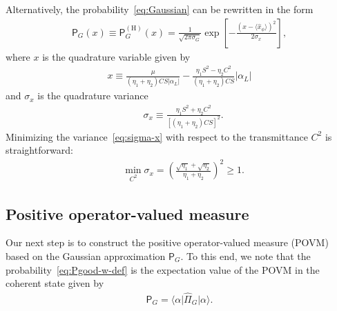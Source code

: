 \documentclass[%
reprint,
superscriptaddress,
 amsmath,amssymb,amsfonts,
 aps,
 pra,
 longbibliography
]{revtex4-2}
\newcommand{\ket}[1]{\ensuremath{|{#1}\rangle}}
\newcommand{\bra}[1]{\ensuremath{\langle{#1}|}}
\newcommand{\avr}[1]{\ensuremath{\langle{#1}\rangle}}
\newcommand{\ind}[1]{\mathrm{#1}}
\newcommand{\prob}{\mathsf{P}}
\DeclareMathOperator*{\argmin}{arg\,min}
\begin{document}
Alternatively, the probability~\eqref{eq:Gaussian}
can be rewritten in the form
\begin{align}
  \label{eq:Pgood-w-def}
{\prob}_G(x)\equiv {\prob}_G^{(\ind{H})}(x)=\frac{1}{\sqrt{2\pi\sigma_G}}
    \exp \left[-\frac{(x-\avr{\hat{x}_\phi})^2}{2\sigma_x}\right],
\end{align}
where
$x$ is the quadrature variable given by
\begin{align}
  \label{eq:x-def}
  x\equiv\frac{\mu}{(\eta_1+\eta_2)CS\left|\alpha_L\right|}-\frac{\eta_1S^2-\eta_2C^2}{\left(\eta_1+\eta_2\right)CS}\left|\alpha_L\right|
\end{align}
and $\sigma_x$ is the quadrature variance
\begin{align}
  &
        \label{eq:sigma-x}
    \sigma_x\equiv
    \frac{\eta_1S^2+\eta_2C^2}{
    \left[(\eta_1+\eta_2)CS\right]^2
    }.
\end{align}
Minimizing the variance~\eqref{eq:sigma-x} with respect to the transmittance $C^2$  is straightforward:
\begin{align}
  \label{eq:sigma-x-min}
  &\min_{C^2}\sigma_{x}=\left(
\frac{\sqrt{\eta_1}+\sqrt{\eta_2}}{\eta_1+\eta_2}
  \right)^2\ge 1.%
\end{align}

\subsection{Positive operator-valued measure}
\label{subsec:hom-POVM}

Our next step is to construct
the positive operator-valued measure
(POVM) based on the Gaussian approximation $\prob_G$.
To this end, we note that the probability~\eqref{eq:Pgood-w-def}
is the expectation value of the POVM in the coherent state
given by
\begin{align}
  \label{eq:PG-as-avr}
    \prob_G=\bra{\alpha}\hat{\Pi}_G\ket{\alpha}.
\end{align}
\end{document}

